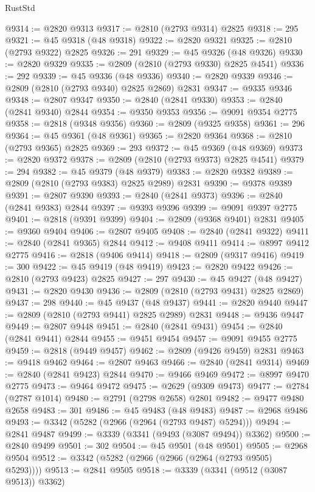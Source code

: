 \begin{lexlean}{RustStd}
\begin{coremodule}
@9314 := @2820 @9313
@9317 := @2810 (@2793 @9314) @2825
@9318 := 295
@9321 := @45 @9318 (@48 @9318)
@9322 := @2820 @9321
@9325 := @2810 (@2793 @9322) @2825
@9326 := 291
@9329 := @45 @9326 (@48 @9326)
@9330 := @2820 @9329
@9335 := @2809 (@2810 (@2793 @9330) @2825 @4541)
@9336 := 292
@9339 := @45 @9336 (@48 @9336)
@9340 := @2820 @9339
@9346 := @2809 (@2810 (@2793 @9340) @2825 @2869) @2831
@9347 := @9335 @9346
@9348 := @2807 @9347
@9350 := @2840 (@2841 @9330)
@9353 := @2840 (@2841 @9340) @2844
@9354 := @9350 @9353
@9356 := @9091 @9354 @2775
@9358 := @2818 (@9348 @9356)
@9360 := @2809 (@9325 @9358)
@9361 := 296
@9364 := @45 @9361 (@48 @9361)
@9365 := @2820 @9364
@9368 := @2810 (@2793 @9365) @2825
@9369 := 293
@9372 := @45 @9369 (@48 @9369)
@9373 := @2820 @9372
@9378 := @2809 (@2810 (@2793 @9373) @2825 @4541)
@9379 := 294
@9382 := @45 @9379 (@48 @9379)
@9383 := @2820 @9382
@9389 := @2809 (@2810 (@2793 @9383) @2825 @2989) @2831
@9390 := @9378 @9389
@9391 := @2807 @9390
@9393 := @2840 (@2841 @9373)
@9396 := @2840 (@2841 @9383) @2844
@9397 := @9393 @9396
@9399 := @9091 @9397 @2775
@9401 := @2818 (@9391 @9399)
@9404 := @2809 (@9368 @9401) @2831
@9405 := @9360 @9404
@9406 := @2807 @9405
@9408 := @2840 (@2841 @9322)
@9411 := @2840 (@2841 @9365) @2844
@9412 := @9408 @9411
@9414 := @8997 @9412 @2775
@9416 := @2818 (@9406 @9414)
@9418 := @2809 (@9317 @9416)
@9419 := 300
@9422 := @45 @9419 (@48 @9419)
@9423 := @2820 @9422
@9426 := @2810 (@2793 @9423) @2825
@9427 := 297
@9430 := @45 @9427 (@48 @9427)
@9431 := @2820 @9430
@9436 := @2809 (@2810 (@2793 @9431) @2825 @2869)
@9437 := 298
@9440 := @45 @9437 (@48 @9437)
@9441 := @2820 @9440
@9447 := @2809 (@2810 (@2793 @9441) @2825 @2989) @2831
@9448 := @9436 @9447
@9449 := @2807 @9448
@9451 := @2840 (@2841 @9431)
@9454 := @2840 (@2841 @9441) @2844
@9455 := @9451 @9454
@9457 := @9091 @9455 @2775
@9459 := @2818 (@9449 @9457)
@9462 := @2809 (@9426 @9459) @2831
@9463 := @9418 @9462
@9464 := @2807 @9463
@9466 := @2840 (@2841 @9314)
@9469 := @2840 (@2841 @9423) @2844
@9470 := @9466 @9469
@9472 := @8997 @9470 @2775
@9473 := @9464 @9472
@9475 := @2629 (@9309 @9473)
@9477 := @2784 (@2787 @1014)
@9480 := @2791 (@2798 @2658) @2801
@9482 := @9477 @9480 @2658
@9483 := 301
@9486 := @45 @9483 (@48 @9483)
@9487 := @2968 @9486
@9493 := @3342 (@5282 (@2966 (@2964 (@2793 @9487) @5294)))
@9494 := @2841 @9487
@9499 := @3339 (@3341 (@9493 (@3087 @9494)) @3362)
@9500 := @2840 @9499
@9501 := 302
@9504 := @45 @9501 (@48 @9501)
@9505 := @2968 @9504
@9512 := @3342 (@5282 (@2966 (@2966 (@2964 (@2793 @9505) @5293))))
@9513 := @2841 @9505
@9518 := @3339 (@3341 (@9512 (@3087 @9513)) @3362)

\end{coremodule}
\end{lexlean}
